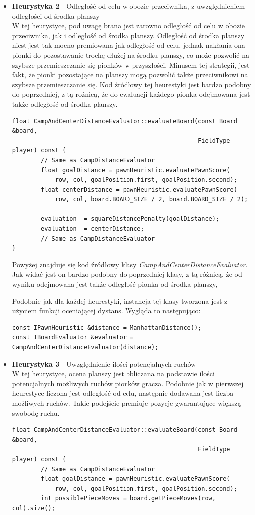 \documentclass[a4paper, 12pt]{article}
\begin{document}
\begin{itemize}
\item \textbf{Heurystyka 2} - Odległość od celu w obozie przeciwnika, z uwzględnieniem 
odległości od środka planszy\\
W tej heurystyce, pod uwagę brana jest zarowno odległość od celu w obozie przeciwnika,
jak i odległość od środka planszy. Odległość od środka planszy niest jest 
tak mocno premiowana jak odległość od celu, jednak nakłania ona pionki do 
pozostawanie trochę dłużej na środku planszy, co może pozwolić na szybsze 
przemieszczanie się pionków w przyszłości. Minusem tej strategii,
jest fakt, że pionki pozostające na planszy mogą pozwolić także przeciwnikowi
na szybsze przemieszczanie się. Kod źródłowy tej heurestyki jest 
bardzo podobny do poprzedniej, z tą rożnicą, że do ewaluacji każdego pionka 
odejmowana jest także odległość od środka planszy.
\begin{lstlisting}
float CampAndCenterDistanceEvaluator::evaluateBoard(const Board &board,
                                                    FieldType player) const {
        // Same as CampDistanceEvaluator
        float goalDistance = pawnHeuristic.evaluatePawnScore(
            row, col, goalPosition.first, goalPosition.second);
        float centerDistance = pawnHeuristic.evaluatePawnScore(
            row, col, board.BOARD_SIZE / 2, board.BOARD_SIZE / 2);

        evaluation -= squareDistancePenalty(goalDistance);
        evaluation -= centerDistance;
        // Same as CampDistanceEvaluator
}
\end{lstlisting}
Powyżej znajduje się kod źródłowy klasy \textit{CampAndCenterDistanceEvaluator}.
Jak widać jest on bardzo podobny do poprzedniej klasy, z tą różnicą, że
od wyniku odejmowana jest także odległość pionka od środka planszy, 

Podobnie jak dla każdej heurestyki, instancja tej klasy tworzona jest 
z użyciem funkcji oceniającej dystans. Wygląda to następująco:
\begin{lstlisting}
const IPawnHeuristic &distance = ManhattanDistance();
const IBoardEvaluator &evaluator = CampAndCenterDistanceEvaluator(distance);
\end{lstlisting}


\item \textbf{Heurystyka 3} - Uwzględnienie ilości potencjalnych ruchów\\
W tej heurystyce, ocena planszy jest obliczana na podstawie ilości
potencjalnych możliwych ruchów pionków gracza. 
Podobnie jak w pierwszej heurestyce liczona jest odległość od celu,
następnie dodawana jest liczba możliwych ruchów. Takie podejście 
premiuje pozycje gwarantujące większą swobodę ruchu. 
\begin{lstlisting}
float CampAndCenterDistanceEvaluator::evaluateBoard(const Board &board,
                                                    FieldType player) const {
        // Same as CampDistanceEvaluator
        float goalDistance = pawnHeuristic.evaluatePawnScore(
            row, col, goalPosition.first, goalPosition.second);
        int possiblePieceMoves = board.getPieceMoves(row, col).size();


\end{lstlisting}
\end{itemize}
\end{document}
